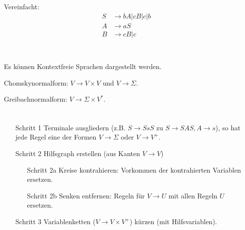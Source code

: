 \documentclass{article}
\begin{document}
Vereinfacht:
\begin{align*}
S &\rightarrow bA | cB | c | b \\
A &\rightarrow aS \\
B &\rightarrow cB | c \\
\end{align*}


\section{}


\section{}
Es können Kontextfreie Sprachen dargestellt werden.

Chomskynormalform: $V \rightarrow V \times V$ und $V \rightarrow \Sigma$.

Greibachnormalform: $V \rightarrow \Sigma \times V^*$.



\section{}
\begin{enumerate}
	\item[Schritt 1] Terminale ausgliedern (z.B. $S \rightarrow SsS$ zu $S \rightarrow SAS, A \rightarrow s$), so hat jede Regel eine der Formen $V\rightarrow \Sigma$ oder $V\rightarrow V^+$.
  \item[Schritt 2] Hilfsgraph erstellen (aus Kanten $V \rightarrow V$)
  \begin{enumerate}
    \item[Schritt 2a] Kreise kontrahieren: Vorkommen der kontrahierten Variablen ersetzen.
    \item[Schritt 2b] Senken entfernen: Regeln für $V\rightarrow U$ mit allen Regeln $U$ ersetzen.
  \end{enumerate}
  \item[Schritt 3] Variablenketten ($V \rightarrow V \times V^+$) kürzen (mit Hilfsvariablen).
\end{enumerate}
\end{document}
